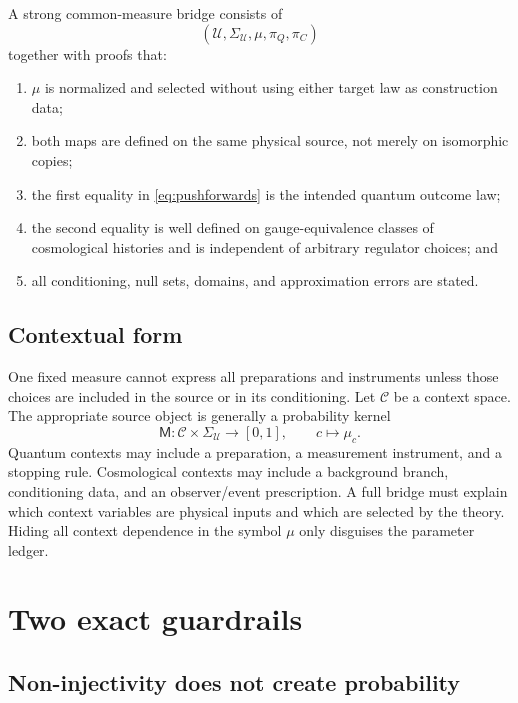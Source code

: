 \documentclass[11pt]{article}
\newcommand{\U}{\mathcal{U}}
\begin{document}
\begin{definition}
A strong common-measure bridge consists of
\[
(\U,\Sigma_{\U},\mu,\pi_Q,\pi_C)
\]
together with proofs that:
\begin{enumerate}
\item \(\mu\) is normalized and selected without using either target law as
construction data;
\item both maps are defined on the same physical source, not merely on
isomorphic copies;
\item the first equality in \eqref{eq:pushforwards} is the intended quantum
outcome law;
\item the second equality is well defined on gauge-equivalence classes of
cosmological histories and is independent of arbitrary regulator choices; and
\item all conditioning, null sets, domains, and approximation errors are
stated.
\end{enumerate}
\end{definition}

\subsection{Contextual form}

One fixed measure cannot express all preparations and instruments unless those
choices are included in the source or in its conditioning. Let
\(\mathcal{C}\) be a context space. The appropriate source object is generally
a probability kernel
\[
\mathsf{M}:\mathcal{C}\times\Sigma_{\U}\longrightarrow[0,1],
\qquad
c\longmapsto\mu_c.
\]
Quantum contexts may include a preparation, a measurement instrument, and a
stopping rule. Cosmological contexts may include a background branch,
conditioning data, and an observer/event prescription. A full bridge must
explain which context variables are physical inputs and which are selected by
the theory. Hiding all context dependence in the symbol \(\mu\) only disguises
the parameter ledger.

\section{Two exact guardrails}

\subsection{Non-injectivity does not create probability}
\end{document}

